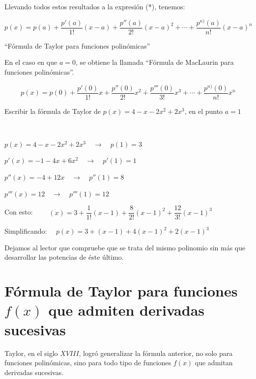 	Llevando todos estos resultados a la expresión (*), tenemos:
	
	\begin{equation}
		\label{Taylor-polinomios}
		  p(x)=p(a)+\dfrac {p'(a)}{1!} (x-a)+\dfrac {p''(a)}{2!} (x-a)^2+\cdots +\dfrac {p^{n)}(a)}{n!} (x-a)^n 
	\end{equation}
	
	\centerline{``Fórmula de Taylor para funciones polinómicas''}
	
	En el caso en que $a=0$, se obtiene la llamada ``Fórmula de MacLaurin para funciones polinómicas''.
	
	\begin{equation}
		\label{MacLaurin-polinomios}
		 p(x)=p(0)+\dfrac {p'(0)}{1!} x+\dfrac {p''(0)}{2!} x^2+\dfrac {p'''(0)}{3!}x^3+\cdots +\dfrac {p^{n)}(0)}{n!} x^n 
	\end{equation}
	\begin{ejem}
	Escribir la fórmula de Taylor de $p(x)=	4-x-2x^2+2x^3$, en el punto $a=1$
	
	$\quad $
	
	$p(x)=	4-x-2x^2+2x^3 \quad \to \quad p(1)=3$
	
	$p'(x)=-1-4x+6x^2 \quad \to \quad  p'(1)=1$
	
	$p''(x)= -4+12x \quad \to \quad  p''(1)=8$
	
	$p'''(x)=12 \quad \to \quad p'''(1)=12$
	
	Con esto:  $\qquad (x)=3+\dfrac {1}{1!}(x-1)+\dfrac {8}{2!}(x-1)^2+\dfrac {12}{3!}(x-1)^3$
	
	Simplificando: $\quad  p(x)= 3+(x-1)+4(x-1)^2+2(x-1)^3$
	
	\textcolor{gris}{Dejamos al lector que compruebe que se trata del mismo polinomio sin más que desarrollar las potencias de éste último.}
	\end{ejem}
	
	\section[Fórmula de Taylor para funciones $f(x)$ que admiten derivadas sucesivas]{Fórmula de Taylor para funciones $f(x)$ que admiten derivadas sucesivas}
	
	Taylor, en el siglo $XVIII$, logró generalizar la fórmula anterior, no solo para funciones polinómicas, sino para todo tipo de funciones $f(x)$ que admitan derivadas sucesivas.
	
